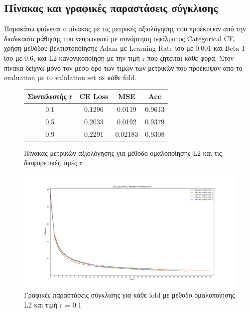 \documentclass[12pt,a4paper]{article}
\begin{document}
\subsection{Πίνακας και γραφικές παραστάσεις σύγκλισης}

Παρακάτω φαίνεται ο πίνακας με τις μετρικές αξιολόγησης που προέκυψαν από την διαδικασία μάθησης του νευρωνικού με συνάρτηση σφάλματος Categorical CE, χρήση μεθόδου βελτιστοποίησης Adam με Learning Rate ίσο με 0.001 και Beta 1 ίσο με 0.6, και L2 κανονικοποίηση με την τιμή r που ζητείται κάθε φορά. Στον πίνακα δείχνω μόνο τον μέσο όρο των τιμών των μετρικών που προέκυψαν από το evaluation με το validation set σε κάθε fold.

\begin{figure}[H]
    \begin{center}
    \begin{tabular}{ |c|c|c|c| } 
        \hline
        \textbf{Συντελεστής r} & \textbf{CE Loss} & \textbf{MSE} & \textbf{Acc} \\ \hline
        0.1 & 0.1296 & 0.0119 & 0.9613 \\
        \hline
        0.5 & 0.2033 & 0.0192 & 0.9379 \\
        \hline
        0.9 & 0.2291 & 0.02183 & 0.9308 \\ 
        \hline
    \end{tabular}
    \end{center}
    \caption{Πίνακας μετρικών αξιολόγησης για μέθοδο ομαλοποίησης L2 και τις διαφορετικές τιμές r}
\end{figure}

\begin{figure}[H]
	\includegraphics[width=\textwidth]{28. L2 with r = 0.1.png}
	\caption{Γραφικές παραστάσεις σύγκλισης για κάθε fold με μέθοδο ομαλοποίησης L2 και τιμή r = 0.1}
\end{figure}
\end{document}
